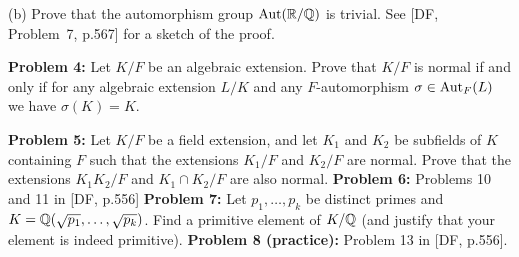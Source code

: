 \documentclass[12pt]{article}
\begin{document}
(b) Prove that the automorphism group ${\rm Aut}({\mathbb R}/{\mathbb Q})$ is trivial.
See [DF, Problem~7, p.567] for a sketch of the proof.

\skv
{\bf Problem 4:} Let $K/F$ be an algebraic extension. Prove that $K/F$
is normal if and only if for any algebraic extension $L/K$ and
any $F$-automorphism $\sigma\in {\rm Aut}_F(L)$ we have $\sigma(K)=K$.

\skv
{\bf Problem 5:} Let $K/F$ be a field extension, and let $K_1$ and $K_2$
be subfields of $K$ containing $F$ such that the extensions
$K_1/F$ and $K_2/F$ are normal. Prove that the extensions
$K_1 K_2/F$ and $K_1\cap K_2/F$ are also normal.
\skv
{\bf Problem 6:} Problems 10 and 11 in [DF, p.556]
\skv
{\bf Problem 7:} Let $p_1,\ldots,p_k$ be distinct primes and
$K={\mathbb Q}(\sqrt{p_1},\ldots,\sqrt{p_k})$. Find a primitive element
of $K/{\mathbb Q}$ (and justify that your element is indeed primitive).
\skv
{\bf Problem 8 (practice):} Problem 13 in [DF, p.556]. 
\end{document}

